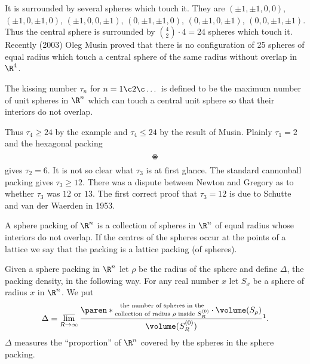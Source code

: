 It is surrounded by several spheres which touch it.  They are $(\pm1,\pm1,0,0)$, $(\pm1,0,\pm1,0)$, $(\pm1,0,0,\pm1)$, $(0,\pm1,\pm1,0)$, $(0,\pm1,0,\pm1)$, $(0,0,\pm1,\pm1)$.  Thus the central sphere is surrounded by $\binom{4}{2}\cdot4=24$ spheres which touch it.  Recently (2003) Oleg Musin proved that there is no configuration of 25 spheres of equal radius which touch a central sphere of the same radius without overlap in $\R^4$.

 The kissing number $\tau_n$ for $n=1\c 2\c \dotsc$ is defined to be the maximum number of unit spheres in $\R^n$ which can touch a central unit sphere so that their interiors do not overlap.

Thus $\tau_4\geq24$ by the example and $\tau_4\leq24$ by the result of Musin.  Plainly $\tau_1=2$ and the hexagonal packing %
\setlength{\unitlength}{0.4cm}
\[ \begin{picture}(6,5.46)(-3,-2.73)
\put(0,0){\circle{2}}
\put(2,0){\circle{2}}
\put(-2,0){\circle{2}}
\put(1,1.73){\circle{2}}
\put(1,-1.73){\circle{2}}
\put(-1,1.73){\circle{2}}
\put(-1,-1.73){\circle{2}}
\end{picture} \]
gives $\tau_2=6$.  It is not so clear what $\tau_3$ is at first glance.  The standard cannonball packing gives $\tau_3\geq12$.  There was a dispute between Newton and Gregory as to whether $\tau_3$ was $12$ or $13$.  The first correct proof that $\tau_3=12$ is due to Schutte and van der Waerden in 1953.

 A sphere packing of $\R^n$ is a collection of spheres in $\R^n$ of equal radius whose interiors do not overlap.  If the centres of the spheres occur at the points of a lattice we say that the packing is a lattice packing (of spheres).

Given a sphere packing in $\R^n$ let $\rho$ be the radius of the sphere and define $\Delta$, the packing density, in the following way.  For any real number $x$ let $S_x$ be a sphere of radius $x$ in $\R^n$.  We put
\[ \Delta = \varlimsup_{R\to\infty} \frac{\paren*{\substack{\text{the number of spheres in the}\\\text{collection of radius $\rho$ inside $S^{(0)}_R$}}}\cdot\volume(S_\rho)}{\volume(S^{(0)}_R)}\footnotemark . \]%
$\Delta$ measures the ``proportion'' of $\R^n$ covered by the spheres in the sphere packing.

